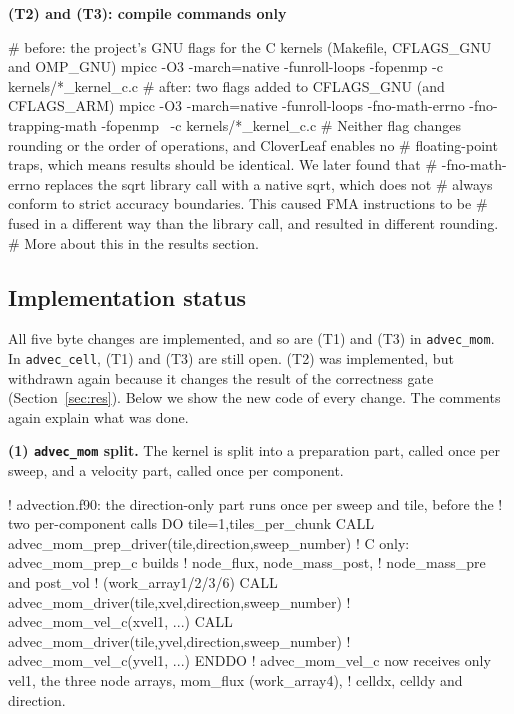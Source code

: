 \documentclass[a4paper,11pt]{article}
\newcommand{\kernel}[1]{\texttt{#1}}
\begin{document}
\textbf{(T2) and (T3): compile commands only}
\begin{code}[language=bash]
# before: the project's GNU flags for the C kernels (Makefile, CFLAGS_GNU and OMP_GNU)
mpicc -O3 -march=native -funroll-loops -fopenmp -c kernels/*_kernel_c.c
# after: two flags added to CFLAGS_GNU (and CFLAGS_ARM)
mpicc -O3 -march=native -funroll-loops -fno-math-errno -fno-trapping-math -fopenmp \
      -c kernels/*_kernel_c.c
# Neither flag changes rounding or the order of operations, and CloverLeaf enables no
# floating-point traps, which means results should be identical. We later found that
# -fno-math-errno replaces the sqrt library call with a native sqrt, which does not
# always conform to strict accuracy boundaries. This caused FMA instructions to be
# fused in a different way than the library call, and resulted in different rounding.
# More about this in the results section.
\end{code}

\subsection{Implementation status}
\label{sec:status}
All five byte changes are implemented, and so are (T1) and (T3) in \kernel{advec\_mom}.
In \kernel{advec\_cell}, (T1) and (T3) are still open.
(T2) was implemented, but withdrawn again because it changes the result of the correctness gate (Section~\ref{sec:res}). Below we show the new code of every change. The comments again explain what was done.

\textbf{(1) \kernel{advec\_mom} split.}
The kernel is split into a preparation part, called once per sweep, and a velocity part, called once per component.
\begin{code}[language={[90]Fortran}]
! advection.f90: the direction-only part runs once per sweep and tile, before the
! two per-component calls
DO tile=1,tiles_per_chunk
  CALL advec_mom_prep_driver(tile,direction,sweep_number) ! C only: advec_mom_prep_c builds
                                                          ! node_flux, node_mass_post,
                                                          ! node_mass_pre and post_vol
                                                          ! (work_array1/2/3/6)
  CALL advec_mom_driver(tile,xvel,direction,sweep_number) ! advec_mom_vel_c(xvel1, ...)
  CALL advec_mom_driver(tile,yvel,direction,sweep_number) ! advec_mom_vel_c(yvel1, ...)
ENDDO
! advec_mom_vel_c now receives only vel1, the three node arrays, mom_flux (work_array4),
! celldx, celldy and direction.
\end{code}
\end{document}
